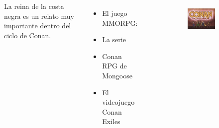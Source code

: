 \begin{frame}{}
	\begin{columns}
		La reina de la costa negra es un relato muy importante dentro del ciclo de Conan.
		\begin{itemize}
			\item El juego MMORPG: 
			\item La serie 
			\item Conan RPG de Mongoose
			\item El videojuego Conan Exiles
		\end{itemize}
		\begin{figure}[htp]
			\centering
			\begin{subfigure}[b]{0.3\textwidth}
				\includegraphics[width=\textwidth]{img/otros/Conantheadventurerlogo}
			\end{subfigure}
			~
			\begin{subfigure}[b]{0.3\textwidth}

\end{subfigure}
\end{figure}
\end{columns}
\end{frame}
